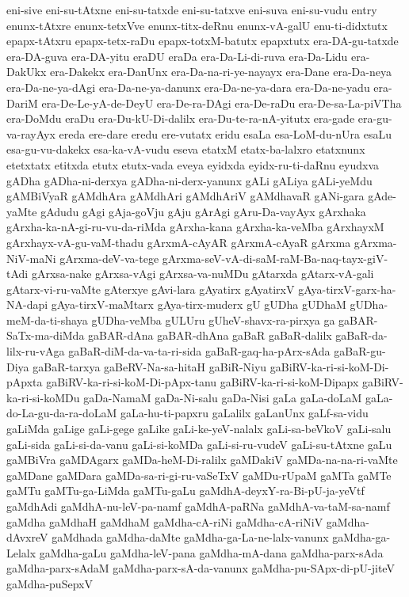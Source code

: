 {eni-sive
eni-su-tAtxne
eni-su-tatxde
eni-su-tatxve
eni-suva
eni-su-vudu
entry
enunx-tAtxre
enunx-tetxVve
enunx-titx-deRnu
enunx-vA-galU
enu-ti-didxtutx
epapx-tAtxru
epapx-tetx-raDu
epapx-totxM-batutx
epapxtutx
era-DA-gu-tatxde
era-DA-guva
era-DA-yitu
eraDU
eraDa
era-Da-Li-di-ruva
era-Da-Lidu
era-DakUkx
era-Dakekx
era-DanUnx
era-Da-na-ri-ye-nayayx
era-Dane
era-Da-neya
era-Da-ne-ya-dAgi
era-Da-ne-ya-danunx
era-Da-ne-ya-dara
era-Da-ne-yadu
era-DariM
era-De-Le-yA-de-DeyU
era-De-ra-DAgi
era-De-raDu
era-De-sa-La-piVTha
era-DoMdu
eraDu
era-Du-kU-Di-dalilx
era-Du-te-ra-nA-yitutx
era-gade
era-gu-va-rayAyx
ereda
ere-dare
eredu
ere-vutatx
eridu
esaLa
esa-LoM-du-nUra
esaLu
esa-gu-vu-dakekx
esa-ka-vA-vudu
eseva
etatxM
etatx-ba-lalxro
etatxnunx
etetxtatx
etitxda
etutx
etutx-vada
eveya
eyidxda
eyidx-ru-ti-daRnu
eyudxva
gADha
gADha-ni-derxya
gADha-ni-derx-yanunx
gALi
gALiya
gALi-yeMdu
gAMBiVyaR
gAMdhAra
gAMdhAri
gAMdhAriV
gAMdhavaR
gANi-gara
gAde-yaMte
gAdudu
gAgi
gAja-goVju
gAju
gArAgi
gAru-Da-vayAyx
gArxhaka
gArxha-ka-nA-gi-ru-vu-da-riMda
gArxha-kana
gArxha-ka-veMba
gArxhayxM
gArxhayx-vA-gu-vaM-thadu
gArxmA-cAyAR
gArxmA-cAyaR
gArxma
gArxma-NiV-maNi
gArxma-deV-va-tege
gArxma-seV-vA-di-saM-raM-Ba-naq-tayx-giV-tAdi
gArxsa-nake
gArxsa-vAgi
gArxsa-va-nuMDu
gAtarxda
gAtarx-vA-gali
gAtarx-vi-ru-vaMte
gAterxye
gAvi-lara
gAyatirx
gAyatirxV
gAya-tirxV-garx-ha-NA-dapi
gAya-tirxV-maMtarx
gAya-tirx-muderx
gU
gUDha
gUDhaM
gUDha-meM-da-ti-shaya
gUDha-veMba
gULUru
gUheV-shavx-ra-pirxya
ga
gaBAR-SaTx-ma-diMda
gaBAR-dAna
gaBAR-dhAna
gaBaR
gaBaR-dalilx
gaBaR-da-lilx-ru-vAga
gaBaR-diM-da-va-ta-ri-sida
gaBaR-gaq-ha-pArx-sAda
gaBaR-gu-Diya
gaBaR-tarxya
gaBeRV-Na-sa-hitaH
gaBiR-Niyu
gaBiRV-ka-ri-si-koM-Di-pApxta
gaBiRV-ka-ri-si-koM-Di-pApx-tanu
gaBiRV-ka-ri-si-koM-Dipapx
gaBiRV-ka-ri-si-koMDu
gaDa-NamaM
gaDa-Ni-salu
gaDa-Nisi
gaLa
gaLa-doLaM
gaLa-do-La-gu-da-ra-doLaM
gaLa-hu-ti-papxru
gaLalilx
gaLanUnx
gaLf-sa-vidu
gaLiMda
gaLige
gaLi-gege
gaLike
gaLi-ke-yeV-nalalx
gaLi-sa-beVkoV
gaLi-salu
gaLi-sida
gaLi-si-da-vanu
gaLi-si-koMDa
gaLi-si-ru-vudeV
gaLi-su-tAtxne
gaLu
gaMBiVra
gaMDAgarx
gaMDa-heM-Di-ralilx
gaMDakiV
gaMDa-na-na-ri-vaMte
gaMDane
gaMDara
gaMDa-sa-ri-gi-ru-vaSeTxV
gaMDu-rUpaM
gaMTa
gaMTe
gaMTu
gaMTu-ga-LiMda
gaMTu-gaLu
gaMdhA-deyxY-ra-Bi-pU-ja-yeVtf
gaMdhAdi
gaMdhA-nu-leV-pa-namf
gaMdhA-paRNa
gaMdhA-va-taM-sa-namf
gaMdha
gaMdhaH
gaMdhaM
gaMdha-cA-riNi
gaMdha-cA-riNiV
gaMdha-dAvxreV
gaMdhada
gaMdha-daMte
gaMdha-ga-La-ne-lalx-vanunx
gaMdha-ga-Lelalx
gaMdha-gaLu
gaMdha-leV-pana
gaMdha-mA-dana
gaMdha-parx-sAda
gaMdha-parx-sAdaM
gaMdha-parx-sA-da-vanunx
gaMdha-pu-SApx-di-pU-jiteV
gaMdha-puSepxV
}
